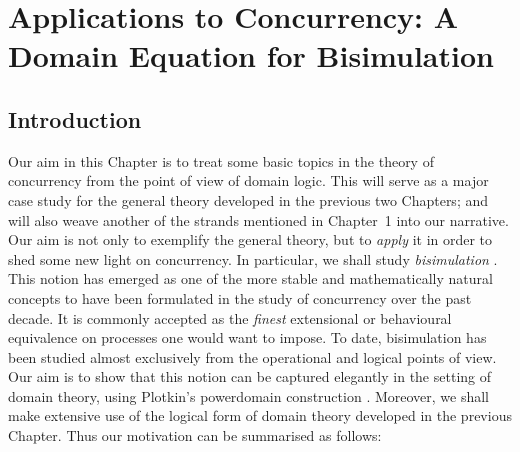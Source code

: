 \chapter{Applications to Concurrency:  
A Domain Equation for Bisimulation}
\section{Introduction}
Our aim in this Chapter is to treat some basic topics in the theory
of concurrency from the point of view of domain logic. 
This will serve as a major case study for the general theory developed in the previous two Chapters; and will also weave another of the strands mentioned in Chapter~1 into our narrative. 
Our aim is not only to exemplify the general theory, but to {\em apply} it in order to shed some new light on concurrency.
In particular, we shall study {\em bisimulation} \cite{Par81,Mil83,HM85}. 
This notion has emerged as one of the more stable and mathematically natural concepts to have been formulated in the study of concurrency over the past decade.
It is commonly accepted as the {\em finest} extensional or behavioural equivalence on processes one would want to impose.
To date, bisimulation has been studied almost exclusively from the operational and logical points of view.
Our aim is to show that this notion can be captured elegantly in the setting of domain theory, using Plotkin's powerdomain construction \cite{Plo76}.
Moreover, we shall make extensive use of the logical form of domain theory developed in the previous Chapter.
Thus our motivation can be summarised as follows:
